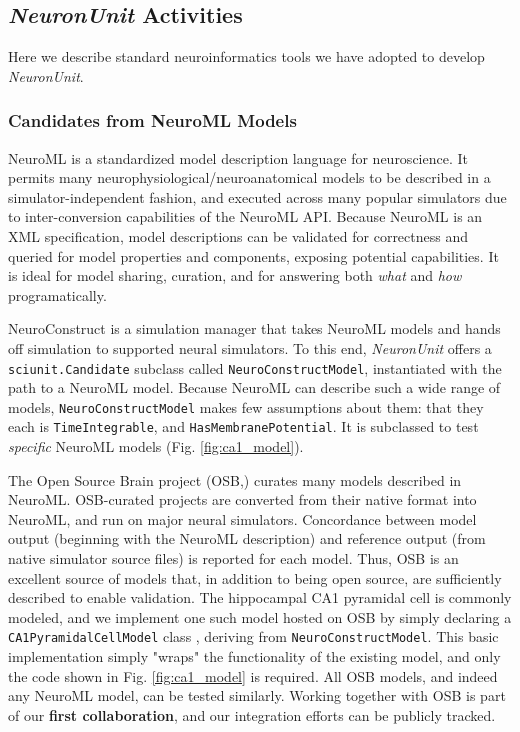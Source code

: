 \documentclass[11pt,letterpaper]{article}
\let\verbx\lstinline
\begin{document}
\subsection{\textit{NeuronUnit} Activities}
\label{sec:neuronunit_acitivities}
Here we describe standard neuroinformatics tools we have adopted to develop \textit{NeuronUnit}\cite{neurounit_url}.  

\subsubsection{Candidates from NeuroML Models}\label{sec:neuroml_candidates}
NeuroML is a standardized model description language for neuroscience\cite{gleeson_neuroml:_2010}. It permits many neurophysiological/neuroanatomical models to be described in a simulator-independent fashion, and executed across many popular simulators due to inter-conversion capabilities of the NeuroML API.  Because NeuroML is an XML specification, model descriptions can be validated for correctness and queried for model properties and components, exposing potential capabilities.  It is ideal for model sharing, curation, and for answering both \textit{what} and \textit{how} programatically.  

NeuroConstruct\cite{neuroconstruct_url,gleeson_neuroconstruct:_2007} is a simulation manager that takes NeuroML models and hands off simulation to supported neural simulators. To this end, \textit{NeuronUnit} offers a \verbx{sciunit.Candidate} subclass called \verbx{NeuroConstructModel}, instantiated with the path to a NeuroML model.  Because NeuroML can describe such a wide range of models, \verbx{NeuroConstructModel} makes few assumptions about them: that they each is \verbx{TimeIntegrable}, and \verbx{HasMembranePotential}.  It is subclassed to test \textit{specific} NeuroML models (Fig. \ref{fig:ca1_model}). 

The Open Source Brain project (OSB,\cite{osb_url}) curates many models described in NeuroML. OSB-curated projects are converted from their native format into NeuroML, and run on major neural simulators\cite{neuron_url,genesis_url,nest_url,moose_url}. Concordance between model output (beginning with the NeuroML description) and reference output (from native simulator source files) is reported for each model.  Thus, OSB is an excellent source of models that, in addition to being open source, are sufficiently described to enable validation.   The hippocampal CA1 pyramidal cell is commonly modeled, and we implement one such model hosted on OSB\cite{osb_ca1_url} by simply declaring a \verbx{CA1PyramidalCellModel} class , deriving from \verbx{NeuroConstructModel}.  This basic implementation simply "wraps" the functionality of the existing model, and only the code shown in Fig. \ref{fig:ca1_model} is required.  All OSB models, and indeed any NeuroML model, can be tested similarly.  Working together with OSB is part of our \textbf{first collaboration}, and our integration efforts can be publicly tracked\cite{neuroconstruct_rgerkin_url}.  
\end{document}
